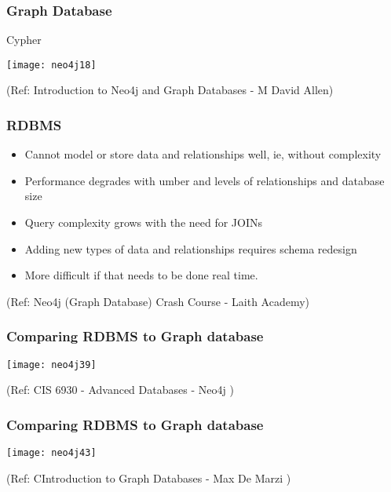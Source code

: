 \begin{frame}[fragile]\frametitle{Graph Database}
Cypher

\begin{center}
\texttt{[image: neo4j18]}
\end{center}	    

{\tiny (Ref: Introduction to Neo4j and Graph Databases
 - M David Allen)}

\end{frame}

\begin{frame}\frametitle{RDBMS}

\begin{itemize}
\item Cannot model or store data and relationships well, ie, without complexity
\item Performance degrades with umber and levels of relationships and database size
\item Query complexity grows with the need for JOINs
\item Adding new types of data and relationships requires schema redesign
\item More difficult if that needs to be done real time.
\end{itemize}

{\tiny (Ref: Neo4j (Graph Database) Crash Course - Laith Academy)}
\end{frame}

\begin{frame}\frametitle{Comparing RDBMS to Graph database}

\begin{center}
\texttt{[image: neo4j39]}
\end{center}	  


{\tiny (Ref: CIS 6930 - Advanced Databases - Neo4j )}
\end{frame}

\begin{frame}\frametitle{Comparing RDBMS to Graph database}

\begin{center}
\texttt{[image: neo4j43]}
\end{center}	  


{\tiny (Ref: CIntroduction to Graph Databases - Max De Marzi )}
\end{frame}

